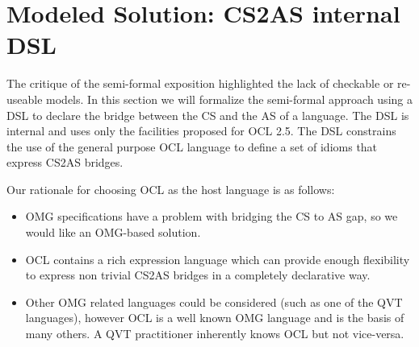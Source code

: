 \documentclass{llncs}
\begin{document}



\section{Modeled Solution: CS2AS internal DSL}
\label{sec:solution}

The critique of the semi-formal exposition highlighted the lack of checkable or re-useable models. In this section we will formalize the semi-formal approach using a DSL to declare the bridge between the CS and the AS of a language. The DSL is  internal\cite{fowler2010dsl} and uses only the facilities proposed for OCL 2.5. The DSL constrains the use of the general purpose OCL language to define  a set of idioms that express CS2AS bridges.

Our rationale for choosing OCL as the host language is as follows:
\begin{itemize}
\item OMG specifications have a problem with bridging the CS to AS gap, so we would like an OMG-based solution.
\item OCL contains a rich expression language which can provide enough flexibility to express non trivial CS2AS bridges in a completely declarative way.
\item Other OMG related languages could be considered (such as one of the QVT languages), however OCL is a well known OMG language and is the basis of many others. A QVT practitioner inherently knows OCL but not vice-versa.
\end{itemize}
\end{document}
